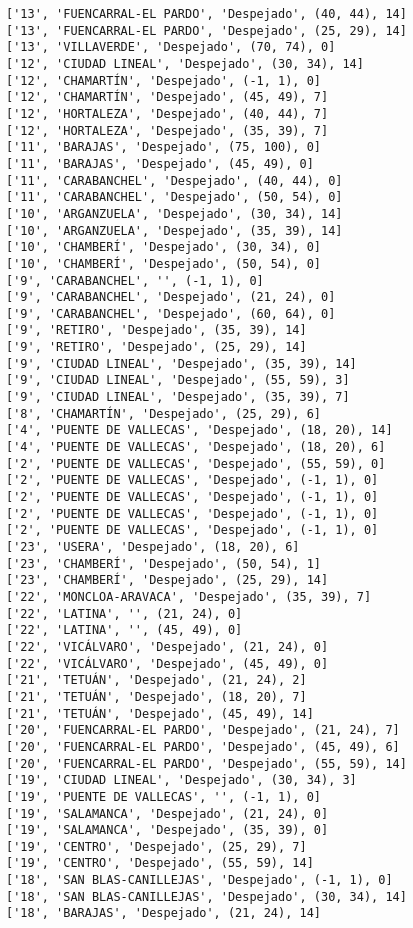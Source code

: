 \documentclass[11pt]{article}
\begin{document}
\begin{Verbatim}[commandchars=\\\{\}]
['13', 'FUENCARRAL-EL PARDO', 'Despejado', (40, 44), 14]
['13', 'FUENCARRAL-EL PARDO', 'Despejado', (25, 29), 14]
['13', 'VILLAVERDE', 'Despejado', (70, 74), 0]
['12', 'CIUDAD LINEAL', 'Despejado', (30, 34), 14]
['12', 'CHAMARTÍN', 'Despejado', (-1, 1), 0]
['12', 'CHAMARTÍN', 'Despejado', (45, 49), 7]
['12', 'HORTALEZA', 'Despejado', (40, 44), 7]
['12', 'HORTALEZA', 'Despejado', (35, 39), 7]
['11', 'BARAJAS', 'Despejado', (75, 100), 0]
['11', 'BARAJAS', 'Despejado', (45, 49), 0]
['11', 'CARABANCHEL', 'Despejado', (40, 44), 0]
['11', 'CARABANCHEL', 'Despejado', (50, 54), 0]
['10', 'ARGANZUELA', 'Despejado', (30, 34), 14]
['10', 'ARGANZUELA', 'Despejado', (35, 39), 14]
['10', 'CHAMBERÍ', 'Despejado', (30, 34), 0]
['10', 'CHAMBERÍ', 'Despejado', (50, 54), 0]
['9', 'CARABANCHEL', '', (-1, 1), 0]
['9', 'CARABANCHEL', 'Despejado', (21, 24), 0]
['9', 'CARABANCHEL', 'Despejado', (60, 64), 0]
['9', 'RETIRO', 'Despejado', (35, 39), 14]
['9', 'RETIRO', 'Despejado', (25, 29), 14]
['9', 'CIUDAD LINEAL', 'Despejado', (35, 39), 14]
['9', 'CIUDAD LINEAL', 'Despejado', (55, 59), 3]
['9', 'CIUDAD LINEAL', 'Despejado', (35, 39), 7]
['8', 'CHAMARTÍN', 'Despejado', (25, 29), 6]
['4', 'PUENTE DE VALLECAS', 'Despejado', (18, 20), 14]
['4', 'PUENTE DE VALLECAS', 'Despejado', (18, 20), 6]
['2', 'PUENTE DE VALLECAS', 'Despejado', (55, 59), 0]
['2', 'PUENTE DE VALLECAS', 'Despejado', (-1, 1), 0]
['2', 'PUENTE DE VALLECAS', 'Despejado', (-1, 1), 0]
['2', 'PUENTE DE VALLECAS', 'Despejado', (-1, 1), 0]
['2', 'PUENTE DE VALLECAS', 'Despejado', (-1, 1), 0]
['23', 'USERA', 'Despejado', (18, 20), 6]
['23', 'CHAMBERÍ', 'Despejado', (50, 54), 1]
['23', 'CHAMBERÍ', 'Despejado', (25, 29), 14]
['22', 'MONCLOA-ARAVACA', 'Despejado', (35, 39), 7]
['22', 'LATINA', '', (21, 24), 0]
['22', 'LATINA', '', (45, 49), 0]
['22', 'VICÁLVARO', 'Despejado', (21, 24), 0]
['22', 'VICÁLVARO', 'Despejado', (45, 49), 0]
['21', 'TETUÁN', 'Despejado', (21, 24), 2]
['21', 'TETUÁN', 'Despejado', (18, 20), 7]
['21', 'TETUÁN', 'Despejado', (45, 49), 14]
['20', 'FUENCARRAL-EL PARDO', 'Despejado', (21, 24), 7]
['20', 'FUENCARRAL-EL PARDO', 'Despejado', (45, 49), 6]
['20', 'FUENCARRAL-EL PARDO', 'Despejado', (55, 59), 14]
['19', 'CIUDAD LINEAL', 'Despejado', (30, 34), 3]
['19', 'PUENTE DE VALLECAS', '', (-1, 1), 0]
['19', 'SALAMANCA', 'Despejado', (21, 24), 0]
['19', 'SALAMANCA', 'Despejado', (35, 39), 0]
['19', 'CENTRO', 'Despejado', (25, 29), 7]
['19', 'CENTRO', 'Despejado', (55, 59), 14]
['18', 'SAN BLAS-CANILLEJAS', 'Despejado', (-1, 1), 0]
['18', 'SAN BLAS-CANILLEJAS', 'Despejado', (30, 34), 14]
['18', 'BARAJAS', 'Despejado', (21, 24), 14]

\end{Verbatim}
\end{document}
